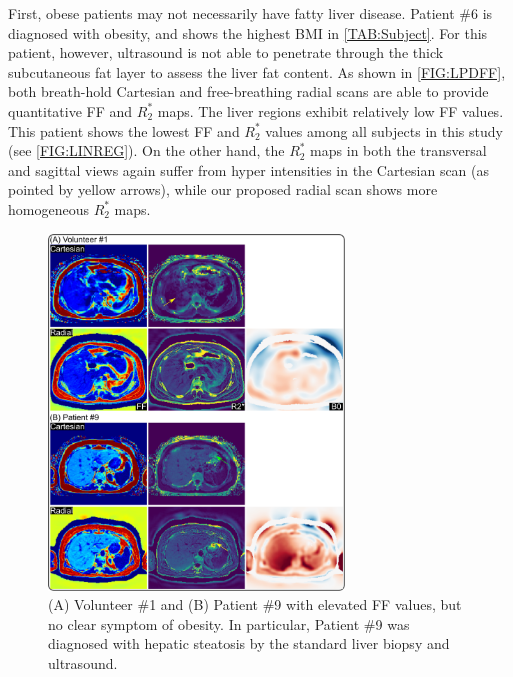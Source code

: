 \documentclass[journal,twoside,web]{ieeecolor}
\begin{document}
First, obese patients may not necessarily have fatty liver disease. 
Patient \#6 is diagnosed with obesity, 
and shows the highest BMI in \cref{TAB:Subject}. 
For this patient, however, ultrasound is not able to penetrate through 
the thick subcutaneous fat layer to assess the liver fat content. 
As shown in \cref{FIG:LPDFF}, 
both breath-hold Cartesian and free-breathing radial scans are able to 
provide quantitative FF and $R_2^*$ maps. The liver regions exhibit 
relatively low FF values. 
This patient shows the lowest FF and $R_2^*$ values 
among all subjects in this study (see \cref{FIG:LINREG}). 
On the other hand, the $R_2^*$ maps 
in both the transversal and sagittal views 
again suffer from hyper intensities in the Cartesian scan 
(as pointed by yellow arrows), 
while our proposed radial scan shows more homogeneous $R_2^*$ maps. 


\begin{figure}
	\centering
	\includegraphics[width=0.70\textwidth]{../../figures/tan10.pdf}
	\caption{(A) Volunteer \#1 and (B) Patient \#9 
		with elevated FF values, but no clear symptom of obesity.
		In particular, Patient \#9 was diagnosed with hepatic steatosis 
		by the standard liver biopsy and ultrasound.}
	\label{FIG:HPDFF}
\end{figure}
\end{document}
